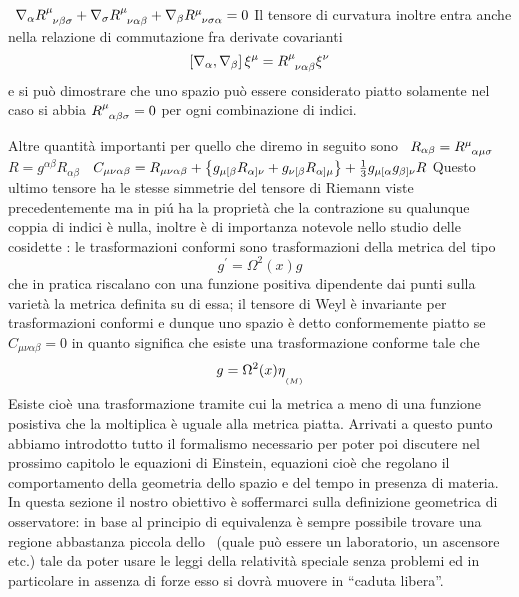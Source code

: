 \ $\nabla_{\alpha}\Mat{R}{\mu}{\nu\beta\sigma}+\nabla_{\sigma}\Mat{R}{\mu}{\nu\alpha\beta}+\nabla_{\beta}\Mat{R}{\mu}{\nu\sigma\alpha}=0$\bigskip\noindent
Il tensore di curvatura inoltre entra anche nella relazione di commutazione fra derivate covarianti
$$
\left[\nabla_\alpha,\nabla_\beta\right]\xi^\mu=\Mat{R}{\mu}{\nu\alpha\beta}\xi^\nu
$$
e si pu\`o dimostrare che uno spazio pu\`o essere considerato piatto solamente nel caso si abbia $\Mat{R}{\mu}{\alpha\beta\sigma}=0$ per ogni combinazione di indici.\par\noindent
Altre quantit\`a importanti per quello che diremo in seguito sono
\ $R_{\alpha\beta}=\Mat{R}{\mu}{\alpha\mu\sigma}$
\ $R=g^{\alpha\beta}R_{\alpha\beta}$
\ $C_{\mu\nu\alpha\beta}=R_{\mu\nu\alpha\beta}+\left\{g_{\mu[\beta}R_{\alpha]\nu}+g_{\nu[\beta}R_{\alpha]\mu}\right\}+{1\over3}g_{\mu[\alpha}g_{\beta]\nu}R$\bigskip\noindent
Questo ultimo tensore ha le stesse simmetrie del tensore di Riemann viste pre\-ce\-den\-te\-men\-te ma in pi\'u ha la propriet\`a che la contrazione su qualunque coppia di indici \`e nulla, inoltre  \`e di importanza notevole nello studio delle cosidette : le trasformazioni conformi sono trasformazioni della metrica del tipo 
$$
g^\prime=\Omega^2(x)g
$$
che in pratica riscalano con una funzione positiva dipendente dai punti sulla variet\`a la metrica definita su di essa; il tensore di Weyl \`e invariante per tra\-sfor\-ma\-zio\-ni conformi e dunque uno spazio \`e detto conformemente piatto se $C_{\mu\nu\alpha\beta}=0$ in quanto significa che esiste una tra\-sfor\-ma\-zio\-ne conforme tale che
$$
g=\Omega^2(x)\etaM 
$$
Esiste cio\`e una trasformazione tramite cui la metrica a meno di una funzione posistiva che la moltiplica \`e uguale alla metrica piatta.
%
%
%
Arrivati a questo punto abbiamo introdotto tutto il formalismo necessario per poter poi discutere nel prossimo capitolo le equazioni di Einstein, equazioni cio\`e che regolano il comportamento della geometria dello spazio e del tempo in presenza di materia. In questa sezione  il nostro obiettivo \`e soffermarci sulla definizione geometrica di osservatore: in base al principio di equivalenza \`e sempre possibile trovare una regione abbastanza piccola dello \ST\ (quale pu\`o essere un laboratorio, un ascensore etc.) tale da poter usare le leggi della relativit\`a speciale senza problemi ed in par\-ti\-co\-la\-re in assenza di forze esso si dovr\`a muovere in ``caduta libera''.\par
